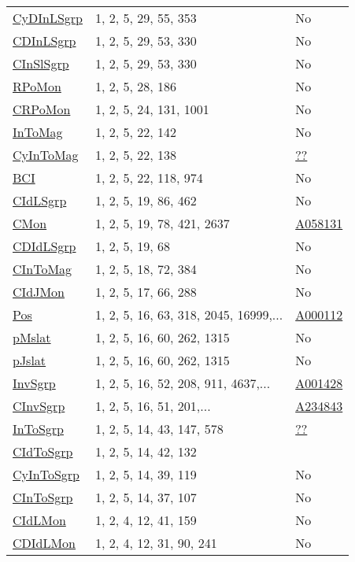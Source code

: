 {\begin{tabular}{|l|l|l|}
\hyperlink{CyDInLSgrp}{CyDInLSgrp}& 1, 2, 5, 29, 55, 353 &No\\
\hyperlink{CDInLSgrp}{CDInLSgrp}& 1, 2, 5, 29, 53, 330 &No\\
\hyperlink{CInSlSgrp}{CInSlSgrp}& 1, 2, 5, 29, 53, 330 &No\\
\hyperlink{RPoMon}{RPoMon}& 1, 2, 5, 28, 186 &No\\
\hyperlink{CRPoMon}{CRPoMon}& 1, 2, 5, 24, 131, 1001 &No\\
\hyperlink{InToMag}{InToMag}& 1, 2, 5, 22, 142 &No\\
\hyperlink{CyInToMag}{CyInToMag}& 1, 2, 5, 22, 138 &\href{http://oeis.org/A001437}{??}\\
\hyperlink{BCI}{BCI}& 1, 2, 5, 22, 118, 974 &No\\
\hyperlink{CIdLSgrp}{CIdLSgrp}& 1, 2, 5, 19, 86, 462 &No\\
\hyperlink{CMon}{CMon}& 1, 2, 5, 19, 78, 421, 2637 &\href{http://oeis.org/A058131}{A058131}\\
\hyperlink{CDIdLSgrp}{CDIdLSgrp}& 1, 2, 5, 19, 68 &No\\
\hyperlink{CInToMag}{CInToMag}& 1, 2, 5, 18, 72, 384 &No\\
\hyperlink{CIdJMon}{CIdJMon}& 1, 2, 5, 17, 66, 288 &No\\
\hyperlink{Pos}{Pos}& 1, 2, 5, 16, 63, 318, 2045, 16999,... &\href{http://oeis.org/A000112}{A000112}\\
\hyperlink{pMslat}{pMslat}& 1, 2, 5, 16, 60, 262, 1315 &No\\
\hyperlink{pJslat}{pJslat}& 1, 2, 5, 16, 60, 262, 1315 &No\\
\hyperlink{InvSgrp}{InvSgrp}& 1, 2, 5, 16, 52, 208, 911, 4637,... &\href{http://oeis.org/A001428}{A001428}\\
\hyperlink{CInvSgrp}{CInvSgrp}& 1, 2, 5, 16, 51, 201,...&\href{http://oeis.org/A234843}{A234843}\\
\hyperlink{InToSgrp}{InToSgrp}& 1, 2, 5, 14, 43, 147, 578 &\href{http://oeis.org/A137555}{??}\\
\hyperlink{CIdToSgrp}{CIdToSgrp}& 1, 2, 5, 14, 42, 132 &\\
\hyperlink{CyInToSgrp}{CyInToSgrp}& 1, 2, 5, 14, 39, 119 &No\\
\hyperlink{CInToSgrp}{CInToSgrp}& 1, 2, 5, 14, 37, 107 &No\\
\hyperlink{CIdLMon}{CIdLMon}& 1, 2, 4, 12, 41, 159 &No\\
\hyperlink{CDIdLMon}{CDIdLMon}& 1, 2, 4, 12, 31, 90, 241 &No\\

\end{tabular}}
